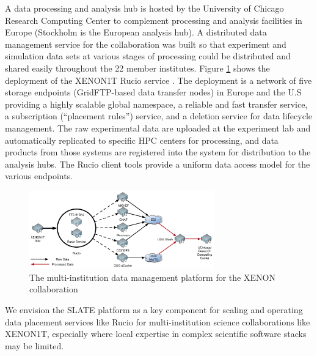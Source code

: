 \documentclass[sigconf]{acmart}
\begin{document}
A data processing and analysis hub is hosted by the University of Chicago Research Computing Center to complement processing and analysis facilities in Europe (Stockholm is the European analysis hub). A distributed data management service for the collaboration was built so that experiment and simulation data sets at various stages of processing could be distributed and shared easily throughout the 22 member institutes. Figure \ref{fig:xenon_data_management} shows the deployment of the XENON1T Rucio service \cite{Rucio}.  The deployment is a network of five storage endpoints (GridFTP-based data transfer nodes) in Europe and the U.S providing a highly scalable global namespace, a reliable and fast transfer service, a subscription (“placement rules”) service, and a deletion service for data lifecycle management. The raw experimental data are uploaded at the experiment lab and automatically replicated to specific HPC centers for processing, and data products from those systems are registered into the system for distribution to the analysis hubs. The Rucio client tools provide a uniform data access model for the various endpoints.

\begin{figure}
    \centering
    \includegraphics[width=8cm]{xenon_data_management.png}
    \caption{The multi-institution data management platform for the XENON collaboration}
    \label{fig:xenon_data_management}
\end{figure}

We envision the SLATE platform as a key component for scaling and operating data placement services like Rucio for multi-institution science collaborations like XENON1T, especially where local expertise in complex scientific software stacks may be limited.
\end{document}
